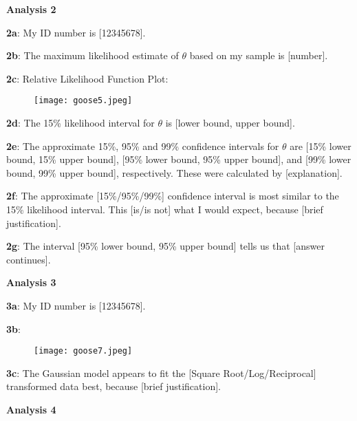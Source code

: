 \documentclass[a4paper,12pt]{article}
\begin{document}
\newpage

\textbf{Analysis 2}\bigskip

\textbf{2a}: My ID number is [12345678].\bigskip

\textbf{2b}: The maximum likelihood estimate of $\theta$ based on my sample is [number].\bigskip

\textbf{2c}: Relative Likelihood Function Plot:

\begin{figure}[H]
     \centering
     \texttt{[image: goose5.jpeg]}
\end{figure}

\textbf{2d}: The 15\% likelihood interval for $\theta$ is [lower bound, upper bound].\bigskip

\textbf{2e}: The approximate 15\%, 95\% and 99\% confidence intervals for $\theta$ are [15\% lower bound, 15\% upper bound], [95\% lower bound, 95\% upper bound], and [99\% lower bound, 99\% upper bound], respectively. These were calculated by [explanation].\bigskip

\textbf{2f}: The approximate [15\%/95\%/99\%] confidence interval is most similar to the 15\% likelihood interval. This [is/is not] what I would expect, because [brief justification].\bigskip

\textbf{2g}: The interval [95\% lower bound, 95\% upper bound] tells us that [answer continues].\bigskip



\newpage

\textbf{Analysis 3}\bigskip

\textbf{3a}: My ID number is [12345678].\bigskip

\textbf{3b}: 

\begin{figure}[H]
     \centering
     \texttt{[image: goose7.jpeg]}
\end{figure}

\textbf{3c}: The Gaussian model appears to fit the [Square Root/Log/Reciprocal] transformed data best, because [brief justification].

\newpage

\textbf{Analysis 4}\bigskip
\end{document}
